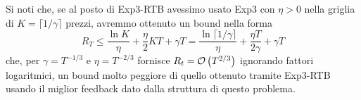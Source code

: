 Si noti che, se al posto di Exp3-RTB avessimo usato Exp3 con $\eta > 0$ nella griglia di $K = \lceil 1/ \gamma \rceil$ prezzi, avremmo ottenuto un bound nella forma 
$$ R_T \leq \frac{\ln K}{\eta} + \frac{\eta}{2} KT + \gamma T = \frac{\ln \lceil 1/ \gamma \rceil}{\eta} + \frac{\eta T}{2 \gamma} + \gamma T $$
che, per $\gamma = T^{-1/3}$ e $\eta = T^{-2/3}$ fornisce $R_t = \mathcal{O} \left(T^{2/3}\right)$ ignorando fattori logaritmici, un bound molto peggiore di quello ottenuto tramite Exp3-RTB usando il miglior feedback dato dalla struttura di questo problema.

